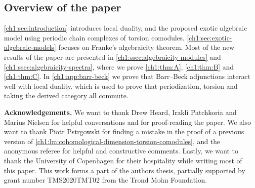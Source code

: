 \subsection*{Overview of the paper}

\cref{ch1:sec:introduction} introduces local duality, and the proposed exotic algebraic model using periodic chain complexes of torsion comodules. \cref{ch1:sec:exotic-algebraic-models} focuses on Franke's algebraicity theorem. Most of the new results of the paper are presented in \cref{ch1:ssec:algebraicity-modules} and \cref{ch1:ssec:algebraicity-spectra}, where we prove \cref{ch1:thm:A}, \cref{ch1:thm:B} and \cref{ch1:thm:C}. In \cref{ch1:app:barr-beck} we prove that Barr--Beck adjunctions interact well with local duality, which is used to prove that periodization, torsion and taking the derived category all commute. 


\textbf{Acknowledgements.} We want to thank Drew Heard, Irakli Patchkoria and Marius Nielsen for helpful conversations and for proof-reading the paper. We also want to thank Piotr Pstr\a{}gowski for finding a mistake in the proof of a previous version of \cref{ch1:lm:cohomological-dimension-torsion-comodules}, and the anonymous referee for helpful and constructive comments. Lastly, we want to thank the University of Copenhagen for their hospitality while writing most of this paper. This work forms a part of the authors thesis, partially supported by grant number TMS2020TMT02 from the Trond Mohn Foundation. 